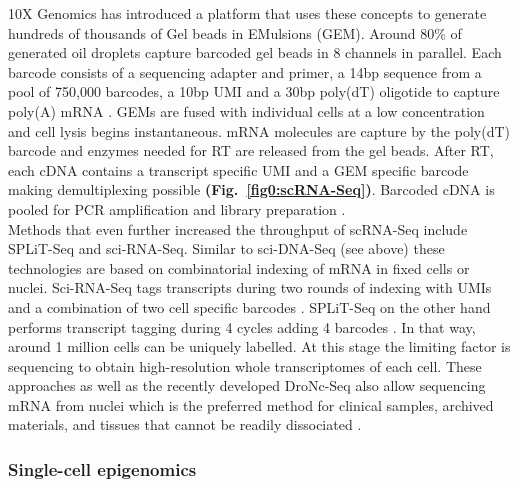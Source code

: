 \newpage

10X Genomics\texttrademark{} has introduced a platform that uses these concepts to generate hundreds of thousands of Gel beads in EMulsions (GEM). Around 80\% of generated oil droplets capture barcoded gel beads in 8 channels in parallel. Each barcode consists of a sequencing adapter and primer, a 14bp sequence from a pool of 750,000 barcodes, a 10bp UMI and a 30bp poly(dT) oligotide to capture poly(A) mRNA \citep{Zheng2017}. GEMs are fused with individual cells at a low concentration and cell lysis begins instantaneous. mRNA molecules are capture by the poly(dT) barcode and enzymes needed for \gls{RT} are released from the gel beads. After RT, each cDNA contains a transcript specific UMI and a GEM specific barcode making demultiplexing possible \textbf{(Fig.~\ref{fig0:scRNA-Seq})}. Barcoded cDNA is pooled for PCR amplification and library preparation \citep{Zheng2017}.\\

Methods that even further increased the throughput of scRNA-Seq include \gls{SPLiT-Seq} and sci-RNA-Seq. Similar to sci-DNA-Seq (see above) these technologies are based on combinatorial indexing of mRNA in fixed cells or nuclei. Sci-RNA-Seq tags transcripts during two rounds of indexing with UMIs and a combination of two cell specific barcodes \citep{Cao2017}.  SPLiT-Seq on the other hand performs transcript tagging during 4 cycles adding 4 barcodes \citep{Rosenberg2018}. In that way, around 1 million cells can be uniquely labelled. At this stage the limiting factor is sequencing to obtain high-resolution whole transcriptomes of each cell.	These approaches as well as the recently developed \gls{DroNc-Seq} also allow sequencing mRNA from nuclei which is the preferred method for clinical samples, archived materials, and tissues that cannot be readily dissociated \citep{Habib2017}. 


\subsubsection{Single-cell epigenomics}

